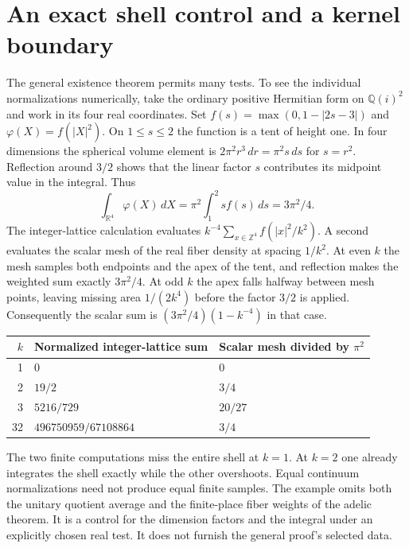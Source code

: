 \documentclass[12pt,letterpaper]{article}
\begin{document}
\section{An exact shell control and a kernel boundary}

The general existence theorem permits many tests. To see the individual normalizations numerically, take the ordinary positive Hermitian form on $\mathbb Q(i)^2$ and work in its four real coordinates. Set $f(s)=\max(0,1-|2s-3|)$ and $\varphi(X)=f(|X|^2)$. On $1\leq s\leq2$ the function is a tent of height one. In four dimensions the spherical volume element is $2\pi^2 r^3\,dr=\pi^2s\,ds$ for $s=r^2$. Reflection around $3/2$ shows that the linear factor $s$ contributes its midpoint value in the integral. Thus
\[
 \int_{\mathbb R^4}\varphi(X)\,dX=\pi^2\int_1^2s f(s)\,ds=3\pi^2/4 .
\]
The integer-lattice calculation evaluates $k^{-4}\sum_{x\in\mathbb Z^4}f(|x|^2/k^2)$. A second evaluates the scalar mesh of the real fiber density at spacing $1/k^2$. At even $k$ the mesh samples both endpoints and the apex of the tent, and reflection makes the weighted sum exactly $3\pi^2/4$. At odd $k$ the apex falls halfway between mesh points, leaving missing area $1/(2k^4)$ before the factor $3/2$ is applied. Consequently the scalar sum is $(3\pi^2/4)(1-k^{-4})$ in that case.
\begin{center}\begin{tabular}{rll}\toprule
$k$ & Normalized integer-lattice sum & Scalar mesh divided by $\pi^2$\\\midrule
1 & $0$ & $0$\\
2 & $19/2$ & $3/4$\\
3 & $5216/729$ & $20/27$\\
32 & $496750959/67108864$ & $3/4$\\\bottomrule
\end{tabular}\end{center}
The two finite computations miss the entire shell at $k=1$. At $k=2$ one already integrates the shell exactly while the other overshoots. Equal continuum normalizations need not produce equal finite samples. The example omits both the unitary quotient average and the finite-place fiber weights of the adelic theorem. It is a control for the dimension factors and the integral under an explicitly chosen real test. It does not furnish the general proof's selected data.
\end{document}
